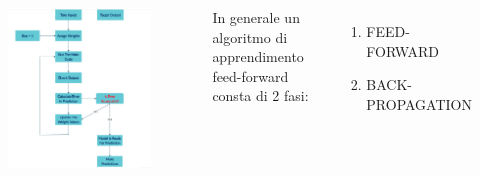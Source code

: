 \documentclass{beamer}
\begin{document}
\begin{frame}
	\frametitle{ }
	
	\begin{columns}
		\begin{figure}
			\includegraphics[width=\textwidth]{ann-flow-chart.png}
		\end{figure}
		In generale un algoritmo di apprendimento feed-forward consta di 2 fasi: 
\begin{enumerate}
   \item FEED-FORWARD 
   \item BACK-PROPAGATION
\end{enumerate} 
	\end{columns}

	
\end{frame}
\end{document}

